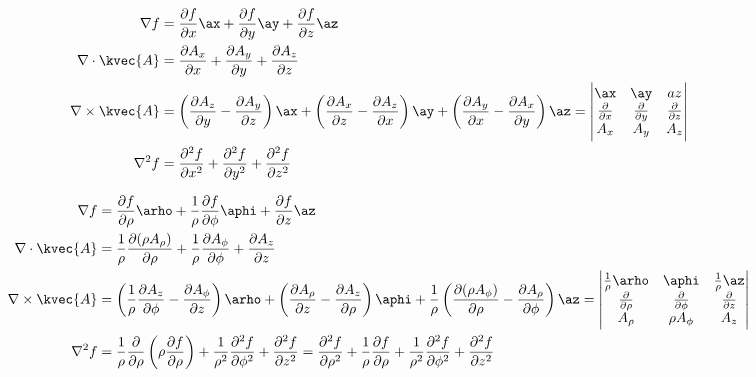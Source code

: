 
\begin{align*}
\nabla f&=\frac{\partial f}{\partial x}\ax+\frac{\partial f}{\partial y}\ay+\frac{\partial f}{\partial z}\az\\
\nabla \cdot \kvec{A}&=\frac{\partial A_x}{\partial x}+\frac{\partial A_y}{\partial y}+\frac{\partial A_z}{\partial z}\\
\nabla \times \kvec{A}&=\left(\frac{\partial A_z}{\partial y}-\frac{\partial A_y}{\partial z} \right)\ax+\left(\frac{\partial A_x}{\partial z}-\frac{\partial A_z}{\partial x} \right)\ay+\left(\frac{\partial A_y}{\partial x}-\frac{\partial A_x}{\partial y} \right)\az=\begin{vmatrix}  \ax & \ay & az\\ \frac{\partial}{\partial x}& \frac{\partial }{\partial y} & \frac{\partial }{\partial z}\\ A_x & A_y & A_z \end{vmatrix}\\
\nabla^2 f &=\frac{\partial^2 f}{\partial x^2}+\frac{\partial^2 f}{\partial y^2}+\frac{\partial^2 f}{\partial z^2}
\end{align*}


\begin{align*}
\nabla f &=\frac{\partial f}{\partial \rho}\arho+\frac{1}{\rho}\frac{\partial f}{\partial \phi}\aphi+\frac{\partial f}{\partial z}\az\\
\nabla \cdot \kvec{A}&=\frac{1}{\rho}\frac{\partial (\rho A_{\rho})}{\partial \rho}+\frac{1}{\rho}\frac{\partial A_{\phi}}{\partial \phi}+\frac{\partial A_z}{\partial z}\\
\nabla \times \kvec{A}&=\left(\frac{1}{\rho}\frac{\partial A_z}{\partial \phi}-\frac{\partial A_{\phi}}{\partial z} \right)\arho+\left(\frac{\partial A_{\rho}}{\partial z}-\frac{\partial A_z}{\partial \rho} \right)\aphi+\frac{1}{\rho}\left(\frac{\partial (\rho A_{\phi})}{\partial \rho}-\frac{\partial A_{\rho}}{\partial \phi} \right)\az =\begin{vmatrix}\frac{1}{\rho}\arho & \aphi & \frac{1}{\rho} \az \\ \frac{\partial}{\partial\rho} & \frac{\partial}{\partial \phi} & \frac{\partial}{\partial z}\\ A_{\rho} & \rho A_{\phi} & A_z \end{vmatrix}\\
\nabla^2 f &=\frac{1}{\rho}\frac{\partial}{\partial \rho}\left(\rho \frac{\partial f}{\partial \rho} \right)+\frac{1}{\rho^2}\frac{\partial^2 f}{\partial \phi^2}+\frac{\partial^2  f}{\partial z^2}=\frac{\partial^2 f}{\partial \rho^2}+\frac{1}{\rho}\frac{\partial f}{\partial \rho}+\frac{1}{\rho^2}\frac{\partial^2 f}{\partial \phi^2}+\frac{\partial^2 f}{\partial z^2}
\end{align*}


